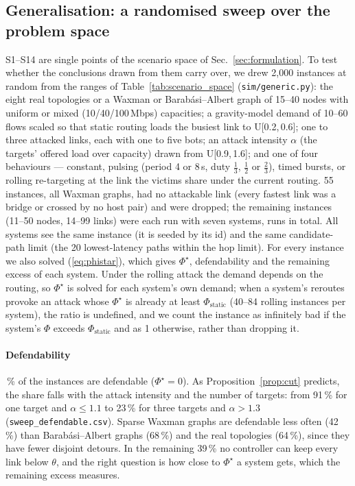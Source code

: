 \subsection{Generalisation: a randomised sweep over the problem space}\label{sec:sweep}

S1--S14 are single points of the scenario space of Sec.~\ref{sec:formulation}. To test whether the
conclusions drawn from them carry over, we drew 2{,}000 instances at random from the ranges of
Table~\ref{tab:scenario_space} (\texttt{sim/generic.py}): the eight real topologies or a Waxman or
Barab\'asi--Albert graph of 15--40 nodes with uniform or mixed (10/40/100\,Mbps) capacities; a
gravity-model demand of 10--60 flows scaled so that static routing loads the busiest link to
U[0.2,\,0.6]; one to three attacked links, each with one to five bots; an attack intensity $\alpha$
(the targets' offered load over capacity) drawn from U[0.9,\,1.6]; and one of four behaviours ---
constant, pulsing (period 4 or 8\,s, duty $\tfrac13$, $\tfrac12$ or $\tfrac23$), timed bursts, or
rolling re-targeting at the link the victims share under the current routing. 55 instances, all
Waxman graphs, had no attackable link (every fastest link was a bridge or crossed by no host pair) and
were dropped; the remaining \sweepN{} instances (11--50 nodes, 14--99 links) were each run with seven
systems, \sweepRuns{} runs in total. All systems see the same instance (it is seeded by its id) and the
same candidate-path limit (the 20 lowest-latency paths within the hop limit). For every instance we
also solved (\ref{eq:phistar}), which gives $\Phi^\star$, defendability and the remaining excess of each
system. Under the rolling attack the demand depends on the routing, so $\Phi^\star$ is solved for each
system's own demand; when a system's reroutes provoke an attack whose $\Phi^\star$ is already at least
$\Phi_{\mathrm{static}}$ (40--84 rolling instances per system), the ratio is undefined, and we count the
instance as infinitely bad if the system's $\Phi$ exceeds $\Phi_{\mathrm{static}}$ and as 1 otherwise,
rather than dropping it.

\paragraph{Defendability}
\sweepDefend\,\% of the instances are defendable ($\Phi^\star=0$). As Proposition~\ref{prop:cut}
predicts, the share falls with the attack intensity and the number of targets: from 91\,\% for one
target and $\alpha\le1.1$ to 23\,\% for three targets and $\alpha>1.3$
(\texttt{sweep\_defendable.csv}). Sparse Waxman graphs are defendable less often (42\,\%) than
Barab\'asi--Albert graphs (68\,\%) and the real topologies (64\,\%), since they have fewer disjoint
detours. In the remaining 39\,\% no controller can keep every link below $\theta$, and the right
question is how close to $\Phi^\star$ a system gets, which the remaining excess measures.

